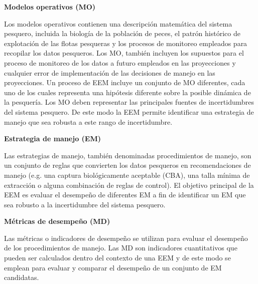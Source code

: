 
\hspace{-20pt}\textbf{Modelos operativos (MO)}
\newline

Los modelos operativos contienen una descripción matemática del sistema pesquero, incluida la biología de la población de peces, el patrón histórico de explotación de las flotas pesqueras y los procesos de monitoreo empleados para recopilar los datos pesqueros. Los MO, también incluyen los supuestos para el proceso de monitoreo de los datos a futuro empleados en las proyecciones y cualquier error de implementación de las decisiones de manejo en las proyecciones. Un proceso de EEM incluye un conjunto de MO diferentes, cada uno de los cuales representa una hipótesis diferente sobre la posible dinámica de la pesquería. Los MO deben representar las principales fuentes de incertidumbres del sistema pesquero. De este modo la EEM permite identificar una estrategia de manejo que sea robusta a este rango de incertidumbre.
\newline

\hspace{-20pt}\textbf{Estrategia de manejo (EM)}
\newline

Las estrategias de manejo, también denominadas procedimientos de manejo, son un conjunto de reglas que convierten los datos pesqueros en recomendaciones de manejo (e.g. una captura biológicamente aceptable (CBA), una talla mínima de extracción o alguna combinación de reglas de control). El objetivo principal de la EEM es evaluar el desempeño de diferentes EM a fin de identificar un EM que sea robusto a la incertidumbre del sistema pesquero.
\newline

\hspace{-20pt}\textbf{Métricas de desempeño (MD)}
\newline

Las métricas o indicadores de desempeño se utilizan para evaluar el desempeño de los procedimientos de manejo. Las MD son indicadores cuantitativos que pueden ser calculados dentro del contexto de una EEM y de este modo se emplean para evaluar y comparar el desempeño de un conjunto de EM candidatas.
